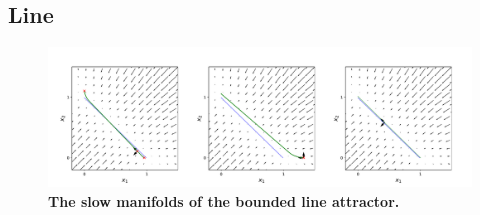 \documentclass{article}
\newcounter{ct}
\theoremstyle{definition}
\theoremstyle{remark}
\begin{document}
\subsection{Line}
\begin{figure}[H]
    \centering
    \includegraphics[width=\textwidth]{figures/bla_slowmanifolds.pdf}
    \caption{\textbf{The slow manifolds of the bounded line attractor.}}
    \label{fig:bla_slowmanifolds}
\end{figure}
\end{document}
